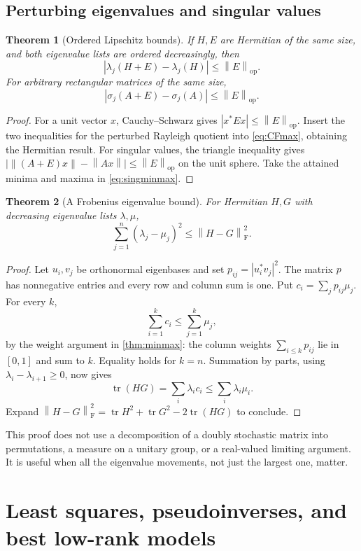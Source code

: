 \documentclass[11pt,a4paper]{article}
\numberwithin{equation}{section}
\newtheorem{theorem}{Theorem}[section]
\theoremstyle{definition}
\theoremstyle{remark}
\newcommand{\tr}{\operatorname{tr}}
\newcommand{\op}{\mathrm{op}}
\newcommand{\Fr}{\mathrm F}
\newcommand{\norm}[1]{\left\lVert#1\right\rVert}
\begin{document}
\subsection{Perturbing eigenvalues and singular values}
\begin{theorem}[Ordered Lipschitz bounds]\label{thm:weyl}
If $H,E$ are Hermitian of the same size, and both eigenvalue lists are
ordered decreasingly, then
\[
 |\lambda_j(H+E)-\lambda_j(H)|\le\norm E_{\op}.
\]
For arbitrary rectangular matrices of the same size,
\begin{equation}\label{eq:singlip}
 |\sigma_j(A+E)-\sigma_j(A)|\le\norm E_{\op}.
\end{equation}
\end{theorem}
\begin{proof}
For a unit vector $x$, Cauchy--Schwarz gives
$|x^*Ex|\le\norm E_{\op}$. Insert the two inequalities for the perturbed
Rayleigh quotient into \eqref{eq:CFmax}, obtaining the Hermitian result.
For singular values, the triangle inequality gives
$\bigl|\norm{(A+E)x}-\norm{Ax}\bigr|\le\norm E_{\op}$ on the unit
sphere. Take the attained minima and maxima in \eqref{eq:singminmax}.
\end{proof}

\begin{theorem}[A Frobenius eigenvalue bound]\label{thm:HW}
For Hermitian $H,G$ with decreasing eigenvalue lists $\lambda,\mu$,
\[
 \sum_{j=1}^n(\lambda_j-\mu_j)^2\le\norm{H-G}_{\Fr}^2.
\]
\end{theorem}
\begin{proof}
Let $u_i,v_j$ be orthonormal eigenbases and set
$p_{ij}=|u_i^*v_j|^2$. The matrix $p$ has nonnegative entries and every row
and column sum is one. Put $c_i=\sum_jp_{ij}\mu_j$. For every $k$,
\[
 \sum_{i=1}^kc_i\le\sum_{j=1}^k\mu_j,
\]
by the weight argument in \cref{thm:minmax}: the column weights
$\sum_{i\le k}p_{ij}$ lie in $[0,1]$ and sum to $k$. Equality holds for
$k=n$. Summation by parts, using $\lambda_i-\lambda_{i+1}\ge0$, now gives
\[
 \tr(HG)=\sum_i\lambda_i c_i\le\sum_i\lambda_i\mu_i.
\]
Expand
$\norm{H-G}_{\Fr}^2=\tr H^2+\tr G^2-2\tr(HG)$ to conclude.
\end{proof}

This proof does not use a decomposition of a doubly stochastic matrix into
permutations, a measure on a unitary group, or a real-valued limiting
argument. It is useful when all the eigenvalue movements, not just the
largest one, matter.

\section{Least squares, pseudoinverses, and best low-rank models}\label{sec:approx}
\end{document}
